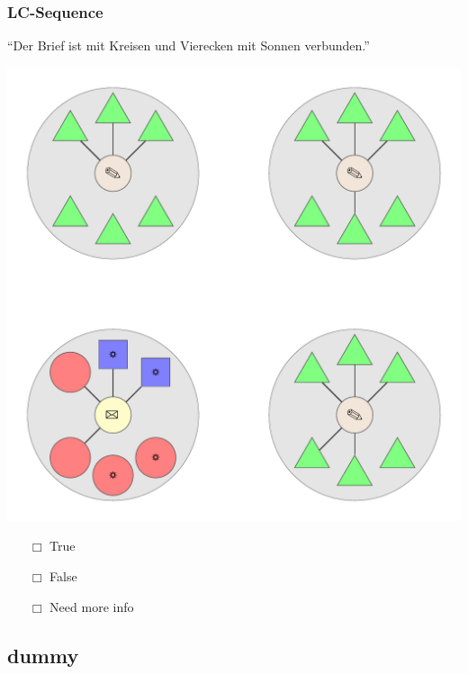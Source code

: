 \documentclass[fleqn,10pt,xcolor=dvipsnames]{beamer}
\newcommand{\LC}{LC\xspace}
\newcommand{\mymark}[1]{{\color{mycol}{#1}}}
\begin{document}
\begin{frame}
  \frametitle{\LC-Sequence}
  \begin{center}
    ``Der Brief ist mit Kreisen und Vierecken mit Sonnen verbunden.''

    \vspace{0.1cm}

    \includegraphics[width=0.5 \textwidth]{../../pictures/lc_01_7.pdf}

    \vspace{0.1cm}

    \begin{multicols}{3}
      \begin{itemize} 
      \item[$\Box$] True\\
        \onslide<2>{$\leadsto$  \mymark{false}}
      \item[$\Box$] False\\
        \onslide<2>{$\leadsto$ \mymark{false}}
      \item[$\Box$] Need more info 
      \end{itemize}
    \end{multicols}

  \end{center}
\end{frame}

\subsection{dummy}
\end{document}
